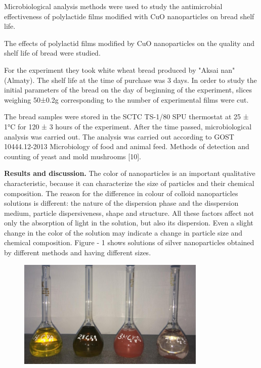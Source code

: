 Microbiological analysis methods were used to study the antimicrobial
effectiveness of polylactide films modified with CuO nanoparticles on
bread shelf life.

The effects of polylactid films modified by CuO nanoparticles on the
quality and shelf life of bread were studied.

For the experiment they took white wheat bread produced by "Aksai nan"
(Almaty). The shelf life at the time of purchase was 3 days. In order to
study the initial parameters of the bread on the day of beginning of the
experiment, slices weighing 50±0.2g corresponding to the number of
experimental films were cut.

The bread samples were stored in the SCTC TS-1/80 SPU thermostat at 25 ±
1°C for 120 ± 3 hours of the experiment. After the time passed,
microbiological analysis was carried out. The analysis was carried out
according to GOST 10444.12-2013 Microbiology of food and animal feed.
Methods of detection and counting of yeast and mold mushrooms {[}10{]}.

{\bfseries Results and discussion.} The color of nanoparticles is an
important qualitative characteristic, because it can characterize the
size of particles and their chemical composition. The reason for the
difference in colour of colloid nanoparticles solutions is different:
the nature of the dispersion phase and the disspersion medium, particle
dispersiveness, shape and structure. All these factors affect not only
the absorption of light in the solution, but also its dispersion. Even a
slight change in the color of the solution may indicate a change in
particle size and chemical composition. Figure - 1 shows solutions of
silver nanoparticles obtained by different methods and having different
sizes.

\begin{figure}[H]
	\centering
	\includegraphics[width=0.8\textwidth]{assets/14}
	\caption*{}
\end{figure}

